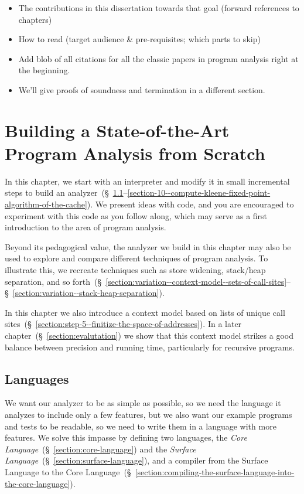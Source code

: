 \documentclass[12pt, oneside]{book}
\begin{document}
\begin{itemize}
  \item The contributions in this dissertation towards that goal (forward references to chapters)
  \item How to read (target audience \& pre-requisites; which parts to skip)
  \item Add blob of all citations for all the classic papers in program analysis right at the beginning.
  \item We’ll give proofs of soundness and termination in a different section.
\end{itemize}

\chapter{Building a State-of-the-Art Program Analysis from Scratch}
\label{section:building-a-state-of-the-art-program-analysis-from-scratch}

In this chapter, we start with an interpreter and modify it in small incremental steps to build an analyzer~(§~\ref{section:languages}–\ref{section-10--compute-kleene-fixed-point-algorithm-of-the-cache}). We present ideas with code, and you are encouraged to experiment with this code as you follow along, which may serve as a first introduction to the area of program analysis.

Beyond its pedagogical value, the analyzer we build in this chapter may also be used to explore and compare different techniques of program analysis. To illustrate this, we recreate techniques such as store widening, stack/heap separation, and so forth~(§~\ref{section:variation--context-model--sets-of-call-sites}–§~\ref{section:variation--stack-heap-separation}).

In this chapter we also introduce a context model based on lists of unique call sites~(§~\ref{section:step-5--finitize-the-space-of-addresses}). In a later chapter~(§~\ref{section:evalutation}) we show that this context model strikes a good balance between precision and running time, particularly for recursive programs.

\section{Languages}
\label{section:languages}

We want our analyzer to be as simple as possible, so we need the language it analyzes to include only a few features, but we also want our example programs and tests to be readable, so we need to write them in a language with more features. We solve this impasse by defining two languages, the \emph{Core Language}~(§~\ref{section:core-language}) and the \emph{Surface Language}~(§~\ref{section:surface-language}), and a compiler from the Surface Language to the Core Language~(§~\ref{section:compiling-the-surface-language-into-the-core-language}).
\end{document}
